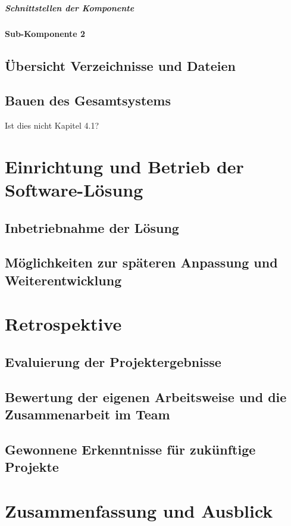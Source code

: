 \documentclass[a4paper,11pt,DIV=12,overfullrule=on]{scrreprt}
\begin{document}
\paragraph{Schnittstellen der Komponente}
\subsubsection{Sub-Komponente 2}
\section{Übersicht Verzeichnisse und Dateien}
\section{Bauen des Gesamtsystems}
Ist dies nicht Kapitel 4.1?


\chapter{Einrichtung und Betrieb der Software-Lösung}
\section{Inbetriebnahme der Lösung}
\section{Möglichkeiten zur späteren Anpassung und Weiterentwicklung}

\chapter{Retrospektive}
\section{Evaluierung der Projektergebnisse}
\section{Bewertung der eigenen Arbeitsweise und die Zusammenarbeit im Team}
\section{Gewonnene Erkenntnisse für zukünftige Projekte}

\chapter{Zusammenfassung und Ausblick}

\listoftables
\listoffigures
\end{document}
